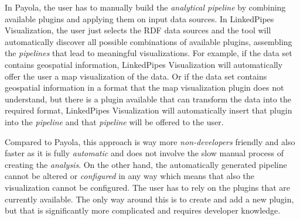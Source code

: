 In Payola, the user has to manually build the \emph{analytical pipeline} by combining available plugins and applying them on input data sources. In LinkedPipes Visualization, the user just selects the RDF data sources and the tool will automatically discover all possible combinations of available plugins, assembling the \emph{pipelines} that lead to meaningful visualizations. For example, if the data set contains geospatial information, LinkedPipes Visualization will automatically offer the user a map visualization of the data. Or if the data set contains geospatial information in a format that the map visualization plugin does not understand, but there is a plugin available that can transform the data into the required format, LinkedPipes Visualization will automatically insert that plugin into the \emph{pipeline} and that \emph{pipeline} will be offered to the user.

Compared to Payola, this approach is way more \emph{non-developers} friendly and also faster as it is fully \emph{automatic} and does not involve the slow manual process of creating the \emph{analysis}. On the other hand,  the automatically generated pipeline cannot be altered or \emph{configured} in any way which means that also the visualization cannot be configured. The user has to rely on the plugins that are currently available. The only way around this is to create and add a new plugin, but that is significantly more complicated and requires developer knowledge.